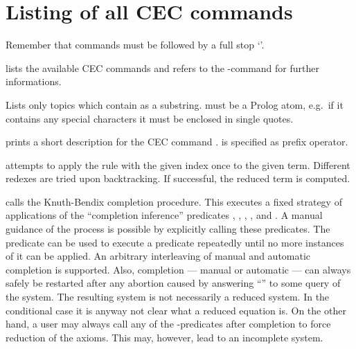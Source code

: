\section{Listing of all CEC commands}
\label{commands}

Remember that commands must be followed by a full stop `'.\bigskip

\begin{command}
lists the available CEC commands and refers to the -command for further
informations.
\end{command}

\begin{command}
Lists only topics which contain  as a substring.
 must be a Prolog atom, e.g.\ if it contains any special
characters it must be enclosed in single quotes.
\end{command}

\begin{command}
prints a short description for the CEC command . 
 is specified as prefix operator.
\end{command}

\begin{command}
attempts to apply the rule with the given index once to the given term.
Different redexes are tried upon backtracking. If successful, the reduced
term is computed.
\end{command}

\begin{command}[\comName{c}]
calls the Knuth-Bendix completion procedure. This executes a fixed strategy
of applications of the ``completion inference'' predicates , 
, , ,  
and .
A manual guidance of the process is possible by explicitly calling these
predicates. The  predicate can be used to execute a predicate 
repeatedly until no more instances of it can be applied. An arbitrary
interleaving of manual and automatic completion is supported. Also,
completion --- manual or automatic --- can always safely be restarted after 
any abortion caused by answering ``'' to some query of the system.
The resulting system is not necessarily a reduced system. In the conditional
case it is anyway not clear what a reduced equation is. On the other hand,
a user may always call any of the -predicates after completion
to force reduction of the axioms. This may, however, lead to an incomplete
system.
\end{command}

